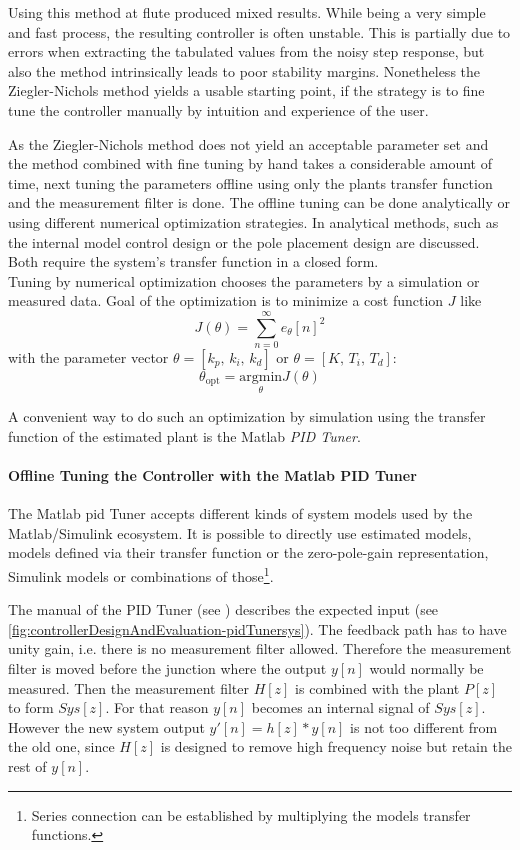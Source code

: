 Using this method at \gls{flute} produced mixed results. While being a very simple and fast process, the resulting controller is often unstable. This is partially due to errors when extracting the tabulated values from the noisy step response, but also the method intrinsically leads to poor stability margins. \cite[p.~142]{Aastroem1995}
Nonetheless the Ziegler-Nichols method yields a usable starting point, if the strategy is to fine tune the controller manually by intuition and experience of the user.

As the Ziegler-Nichols method does not yield an acceptable parameter set and the method combined with fine tuning by hand takes a considerable amount of time, next tuning the parameters offline using only the plants transfer function and the measurement filter is done.
The offline tuning can be done analytically or using different numerical optimization strategies. In \cite{DiazRodriguez2019} analytical methods, such as the internal model control design or the pole placement design are discussed. Both require the system's transfer function in a closed form.\\
Tuning by numerical optimization chooses the parameters by a simulation or measured data. Goal of the optimization is to minimize a cost function $J$ like
\begin{equation}
J(\theta) = \sum_{n=0}^{\infty} e_{\theta}[n]^2
\end{equation}
with the parameter vector $\theta=[k_p,\,k_i,\,k_d]$ or $\theta=[K,\,T_i,\,T_d]$:
\begin{equation}
\theta_\text{opt} = \underset{\theta}{\text{argmin}} J(\theta)
\end{equation}

A convenient way to do such an optimization by simulation using the transfer function of the estimated plant is the Matlab \textit{PID Tuner}.

\paragraph{Offline Tuning the Controller with the Matlab PID Tuner}
The Matlab \gls{pid} Tuner accepts different kinds of system models used by the Matlab/Simulink ecosystem. It is possible to directly use estimated models, models defined via their transfer function or the zero-pole-gain representation, Simulink models or combinations of those\footnote{Series connection can be established by multiplying the models transfer functions.}.

The manual of the PID Tuner (see \cite{pidTunerMan}) describes the expected input (see \autoref{fig:controllerDesignAndEvaluation-pidTunersys}). The feedback path has to have unity gain, i.e. there is no measurement filter allowed. Therefore the measurement filter is moved before the junction where the output $y[n]$ would normally be measured. Then the measurement filter $H[z]$ is combined with the plant $P[z]$ to form $Sys[z]$. For that reason $y[n]$ becomes an internal signal of $Sys[z]$. However the new system output $y'[n]=h[z] \ast y[n]$ is not too different from the old one, since $H[z]$ is designed to remove high frequency noise but retain the rest of $y[n]$.

